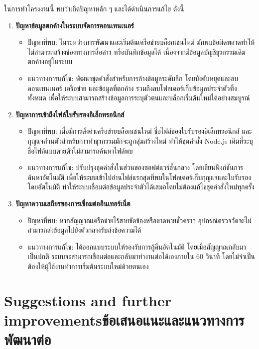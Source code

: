 ในการทำโครงงานนี้ พบว่าเกิดปัญหาหลัก ๆ และได้ดำเนินการแก้ไข ดังนี้

\begin{enumerate}
    \item \textbf{ปัญหาข้อมูลตกค้างในระบบจัดการคอนเทนเนอร์}
    \begin{itemize}
        \item ปัญหาที่พบ: ในระหว่างการพัฒนาและเริ่มต้นเครือข่ายบล็อกเชนใหม่ มักพบข้อผิดพลาดทำให้ไม่สามารถสร้างช่องทางการสื่อสาร หรือบันทึกข้อมูลได้ เนื่องจากมีข้อมูลบัญชีธุรกรรมเดิมตกค้างอยู่ในระบบ
        \item แนวทางการแก้ไข: พัฒนาชุดคำสั่งสำหรับการล้างข้อมูลระดับลึก โดยบังคับหยุดและลบคอนเทนเนอร์ เครือข่าย และข้อมูลที่ตกค้าง รวมถึงลบโฟลเดอร์เก็บข้อมูลประจำตัวทิ้งทั้งหมด เพื่อให้ระบบสามารถสร้างข้อมูลการระบุตัวตนและบล็อกเริ่มต้นใหม่ได้อย่างสมบูรณ์
    \end{itemize}
    \item \textbf{ปัญหาการเข้าถึงไฟล์ใบรับรองอิเล็กทรอนิกส์}
    \begin{itemize}
        \item ปัญหาที่พบ: เมื่อมีการตั้งค่าเครือข่ายบล็อกเชนใหม่ ชื่อไฟล์ของใบรับรองอิเล็กทรอนิกส์ และกุญแจส่วนตัวสำหรับการทำธุรกรรมมักจะถูกสุ่มสร้างใหม่ ทำให้ชุดคำสั่ง Node.js เดิมที่ระบุชื่อไฟล์แบบตายตัวไม่สามารถค้นหาไฟล์พบ
        \item แนวทางการแก้ไข: ปรับปรุงชุดคำสั่งในส่วนของซอฟต์แวร์ชั้นกลาง โดยเขียนฟังก์ชันการค้นหาอัตโนมัติ เพื่อให้ระบบเข้าไปอ่านไฟล์แรกสุดที่พบในโฟลเดอร์เก็บกุญแจและใบรับรองโดยอัตโนมัติ ทำให้ระบบเชื่อมต่อข้อมูลประจำตัวได้เสมอโดยไม่ต้องแก้ไขชุดคำสั่งใหม่ทุกครั้ง
    \end{itemize}
    \item \textbf{ปัญหาความเสถียรของการเชื่อมต่ออินเทอร์เน็ต}
    \begin{itemize}
        \item ปัญหาที่พบ: หากสัญญาณเครือข่ายไร้สายขัดข้องหรือขาดหายชั่วคราว อุปกรณ์ตรวจวัดจะไม่สามารถส่งข้อมูลไปยังตัวกลางรับส่งข้อความได้
        \item แนวทางการแก้ไข: ได้ออกแบบระบบให้รองรับการกู้คืนอัตโนมัติ โดยเมื่อสัญญาณกลับมาเป็นปกติ ระบบจะสามารถเชื่อมต่อและกลับมาทำงานต่อได้เองภายใน 60 วินาที โดยไม่จำเป็นต้องให้ผู้ใช้งานทำการเริ่มต้นระบบใหม่ด้วยตนเอง
    \end{itemize}
\end{enumerate}

\section{\ifenglish Suggestions and further improvements\else ข้อเสนอแนะและแนวทางการพัฒนาต่อ\fi}

